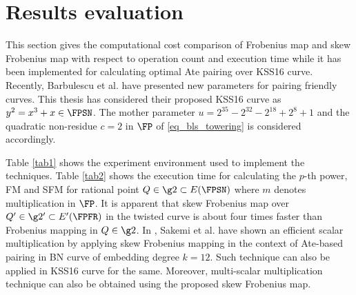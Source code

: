 \section{Results evaluation}
This section gives the computational cost comparison of Frobenius map and skew Frobenius map  with respect to operation count and execution time while it has been implemented for calculating optimal Ate pairing over KSS16 curve. Recently, Barbulescu et al. \cite{EPRINT:BarDuq17} have presented new parameters for pairing friendly curves. This thesis has considered their proposed KSS16 curve as $y^2=x^3+x \in \FPSN$. The mother parameter $ u=2^{35}-2^{32}-2^{18}+2^{8}+1$ and the quadratic non-residue  $c=2$ in $\FP$ of \eqref{eq_bls_towering} is considered accordingly.

Table \ref{tab1} shows the experiment environment used to implement the techniques. Table \ref{tab2} shows the execution time for calculating the $p$-th power, FM and SFM for rational point $Q \in \g2 \subset E(\FPSN)$ where $m$ denotes multiplication in $\FP$.  It is apparent that skew Frobenius map over $Q' \in \g2' \subset E'(\FPFR)$ in the twisted curve is about four times faster than Frobenius mapping in  $Q \in \g2$. In \cite{CANS:SNOKM08}, Sakemi et al. have shown an efficient scalar multiplication by applying skew Frobenius mapping in the context of Ate-based pairing in BN curve of embedding degree $k=12$. Such technique can also be applied in KSS16 curve for the same. Moreover, multi-scalar multiplication technique can also be obtained using the proposed skew Frobenius map.
\renewcommand{\baselinestretch}{1.5}
\begin{table}[!ht]
\centering
\caption{ Computational Environment}
\label{tab1}
\end{table}
